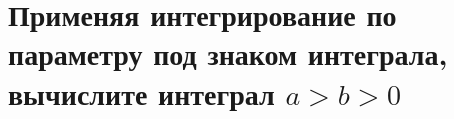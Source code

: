 \documentclass[a4paper, fleqn]{article}
\begin{document}

\section*{Применяя интегрирование по параметру под знаком интеграла, вычислите интеграл $a > b > 0$}

\end{document}
